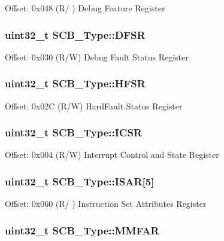 Offset\-: 0x048 (R/ ) Debug Feature Register \hypertarget{structSCB__Type_ad7d61d9525fa9162579c3da0b87bff8d}{
\subsubsection[{D\-F\-S\-R}]{ uint32\-\_\-t S\-C\-B\-\_\-\-Type\-::\-D\-F\-S\-R}}\label{structSCB__Type_ad7d61d9525fa9162579c3da0b87bff8d}
Offset\-: 0x030 (R/\-W) Debug Fault Status Register \hypertarget{structSCB__Type_a7bed53391da4f66d8a2a236a839d4c3d}{
\subsubsection[{H\-F\-S\-R}]{ uint32\-\_\-t S\-C\-B\-\_\-\-Type\-::\-H\-F\-S\-R}}\label{structSCB__Type_a7bed53391da4f66d8a2a236a839d4c3d}
Offset\-: 0x02\-C (R/\-W) Hard\-Fault Status Register \hypertarget{structSCB__Type_a3e66570ab689d28aebefa7e84e85dc4a}{
\subsubsection[{I\-C\-S\-R}]{ uint32\-\_\-t S\-C\-B\-\_\-\-Type\-::\-I\-C\-S\-R}}\label{structSCB__Type_a3e66570ab689d28aebefa7e84e85dc4a}
Offset\-: 0x004 (R/\-W) Interrupt Control and State Register \hypertarget{structSCB__Type_acee8e458f054aac964268f4fe647ea4f}{
\subsubsection[{I\-S\-A\-R}]{ uint32\-\_\-t S\-C\-B\-\_\-\-Type\-::\-I\-S\-A\-R\mbox{[}5\mbox{]}}}\label{structSCB__Type_acee8e458f054aac964268f4fe647ea4f}
Offset\-: 0x060 (R/ ) Instruction Set Attributes Register \hypertarget{structSCB__Type_ac49b24b3f222508464f111772f2c44dd}{
\subsubsection[{M\-M\-F\-A\-R}]{ uint32\-\_\-t S\-C\-B\-\_\-\-Type\-::\-M\-M\-F\-A\-R}}\label{structSCB__Type_ac49b24b3f222508464f111772f2c44dd}
